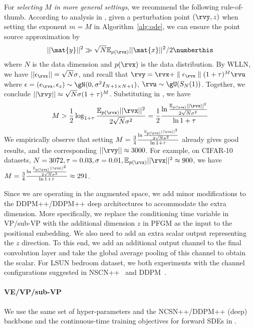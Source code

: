 For \textit{selecting $M$ in more general settings}, we recommend the following rule-of-thumb. According to analysis in , given a perturbation point $(\rvy,z)$ when setting the exponent $m=M$ in Algorithm~\ref{alg:ode}, we can ensure the point source approximation by
\begin{align*}
    {||\mat{y}||^2}\gg {\sqrt{N}{\mathbb{E}}_{p(\rvx)}||\mat{x}||^2}/2 \numberthis \label{eq:rule-M}
\end{align*}
where $N$ is the data dimension and $p(\rvx)$ is the data distribution. By WLLN, we have $||\epsilon_\rvx|| = \sqrt{N}\sigma$, and recall that $
    \rvy = \rvx+\parallel \epsilon_\rvx \parallel(1+\tau)^M\rvu
$
where $\epsilon = (\epsilon_\rvx, \epsilon_z) \sim \gN(0, \sigma^2I_{N+1\times N+1})$, $\rvu\sim \gU(S_N(1))$. Together, we conclude $||\rvy|| \approx \sqrt{N}\sigma(1+\tau)^M$. Substituting in , we have 
\begin{align*}
    M > \frac12 \log_{1+\tau}{\frac{\mathbb{E}_{p(\rvx)}||\rvx||^2}{2\sqrt{N}\sigma^2}} = \frac12 \frac{\ln{\frac{\mathbb{E}_{p(\rvx)}||\rvx||^2}{2\sqrt{N}\sigma^2}}}{\ln{1+\tau}}
\end{align*}
We empirically observe that setting $M=  \frac34 \frac{\ln{\frac{\mathbb{E}_{p(\rvx)}||\rvx||^2}{2\sqrt{N}\sigma^2}}}{\ln{1+\tau}}$ already gives good results, and the corresponding $||\rvy||\approx 3000$. For example, on CIFAR-10 datasets, $N=3072, \tau=0.03, \sigma=0.01, \mathbb{E}_{p(\rvx)}||\rvx||^2\approx 900$, we have $M=\frac34 \frac{\ln{\frac{\mathbb{E}_{p(\rvx)}||\rvx||^2}{2\sqrt{N}\sigma^2}}}{\ln{1+\tau}} \approx 291$. 

Since we are operating in the augmented space, we add minor modifications to the DDPM++/DDPM++ deep architectures to accommodate the extra dimension. More specifically, we replace the conditioning time variable in VP/sub-VP with the additional dimension $z$ in PFGM as the input to the positional embedding. We also need to add an extra scalar output representing the $z$ direction. To this end, we add an additional output channel to the final convolution layer and take the global average pooling of this channel to obtain the scalar. {For LSUN bedroom dataset, we both experiments with the channel configurations suggested in NSCN++~\cite{Song2021ScoreBasedGM} and DDPM~\cite{Ho2020DenoisingDP}.}

\paragraph{VE/VP/sub-VP} We use the same set of hyper-parameters and the NCSN++/DDPM++ (deep) backbone and the continuous-time training objectives for forward SDEs in \cite{Song2021ScoreBasedGM}.

